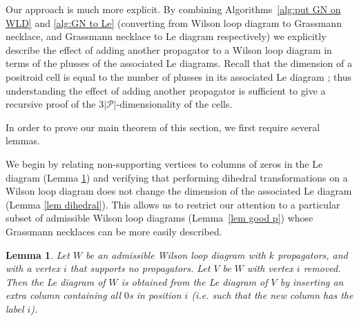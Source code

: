 \documentclass[11pt]{article}
\newcommand{\cP}{\mathcal{P}}
\newtheorem{lem}[thm]{Lemma}
\theoremstyle{remark}
\theoremstyle{definition}
\begin{document}
Our approach is much more explicit. By combining Algorithms~\ref{alg:put GN on WLD} and \ref{alg:GN to Le} (converting from Wilson loop diagram to Grassmann necklace, and Grassmann necklace to Le diagram respectively) we explicitly describe the effect of adding another propagator to a Wilson loop diagram in terms of the plusses of the associated Le diagrams. Recall that the dimension of a positroid cell is equal to the number of plusses in its associated Le diagram \cite[Theorem 6.5]{Postnikov}; thus understanding the effect of adding another propagator is sufficient to give a recursive proof of the $3|\cP|$-dimensionality of the cells.




In order to prove our main theorem of this section, we first require several lemmas. 

We begin by relating non-supporting vertices to columns of zeros in the Le diagram (Lemma \ref{lem uncovered}) and verifying that performing dihedral transformations on a Wilson loop diagram does not change the dimension of the associated Le diagram (Lemma \ref{lem dihedral}). This allows us to restrict our attention to a particular subset of admissible Wilson loop diagrams (Lemma~\ref{lem good p}) whose Grassmann necklaces can be more easily described. 

\vspace{0.5em} %
\begin{lem}\label{lem uncovered}
Let $W$ be an admissible Wilson loop diagram with $k$ propagators, and with a vertex $i$ that supports no propagators.  Let $V$ be $W$ with vertex $i$ removed.  Then the Le diagram of $W$ is obtained from the Le diagram of $V$ by inserting an extra column containing all $0$s in position $i$ (i.e. such that the new column has the label $i$).
\end{lem} 
\end{document}
